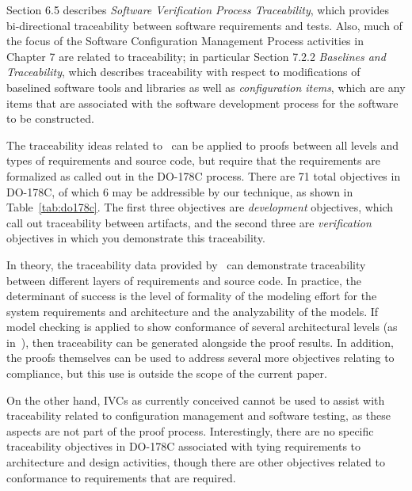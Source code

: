 
Section 6.5 describes {\em Software Verification Process Traceability}, which provides bi-directional traceability between software requirements and tests.  Also, much of the focus of the Software Configuration Management Process activities in Chapter 7 are related to traceability; in particular Section 7.2.2 {\em Baselines and Traceability}, which describes traceability with respect to modifications of baselined software tools and libraries as well as {\em configuration items}, which are any items that are associated with the software development process for the software to be constructed.

The traceability ideas related to \mivcs\ can be applied to proofs between all levels and types of requirements and source code, but require that the requirements are formalized as called out in the DO-178C process.  There are 71 total objectives in DO-178C, of which 6 may be addressible by our technique, as shown in Table~\ref{tab:do178c}.  The first three objectives are {\em development} objectives, which call out traceability between artifacts, and the second three are {\em verification} objectives in which you demonstrate this traceability.

In theory, the traceability data provided by \mivcs\ can demonstrate traceability between different layers of requirements and source code.  In practice, the determinant of success is the level of formality of the modeling effort for the system requirements and architecture and the analyzability of the models.  If model checking is applied to show conformance of several architectural levels (as in~\cite{QFCS15:backes,hilt2013}), then traceability can be generated alongside the proof results.   In addition, the proofs themselves can be used to address several more objectives relating to compliance, but this use is outside the scope of the current paper.

On the other hand, IVCs as currently conceived cannot be used to assist with traceability related to configuration management and software testing, as these aspects are not part of the proof process.  Interestingly, there are no specific traceability objectives in DO-178C associated with tying requirements to architecture and design activities, though there are other objectives related to conformance to requirements that are required.  

